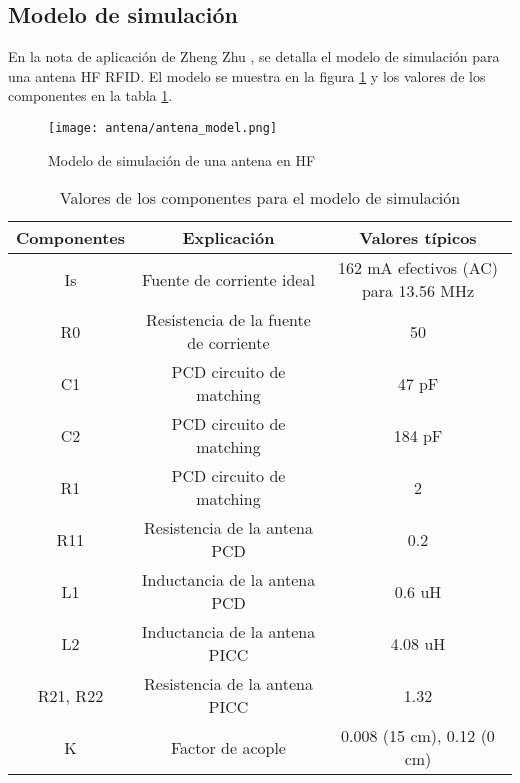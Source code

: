 \subsection{Modelo de simulación}

En la nota de aplicación de Zheng Zhu \cite{shunt1}, se detalla el modelo de simulación para una antena HF RFID. El modelo se muestra en la figura \ref{fig:ant_model} y los valores de los componentes en la tabla \ref{table:sim_values}.

\begin{figure}[H]
\centering
\texttt{[image: antena/antena\_model.png]}
\caption{Modelo de simulación de una antena en HF}
\label{fig:ant_model}
\end{figure}

\begin{table}[h]
\centering
\caption{Valores de los componentes para el modelo de simulación}
\label{table:sim_values}
\begin{tabular}{c|c|c}
Componentes & Explicación                           & Valores típicos                      \\ \hline
Is          & Fuente de corriente ideal             & 162 mA efectivos (AC) para 13.56 MHz \\
R0          & Resistencia de la fuente de corriente & 50                                   \\
C1          & PCD circuito de matching              & 47 pF                                \\
C2          & PCD circuito de matching              & 184 pF                               \\
R1          & PCD circuito de matching              & 2                                    \\
R11         & Resistencia de la antena PCD          & 0.2                                  \\
L1          & Inductancia de la antena PCD          & 0.6 uH                               \\
L2          & Inductancia de la antena PICC         & 4.08 uH                              \\
R21, R22    & Resistencia de la antena PICC         & 1.32                                 \\
K           & Factor de acople                      & 0.008 (15 cm), 0.12 (0 cm)          
\end{tabular}
\end{table}

\clearpage

